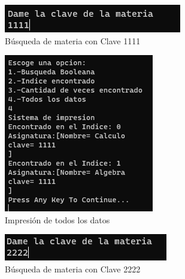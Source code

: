 \documentclass{report}
\begin{document}
\begin{figure}
    \centering
    \includegraphics[width=1\linewidth]{Imagen25.png}
    \caption{Búsqueda de materia con Clave 1111}
    
\end{figure}
\begin{figure}
    \centering
    \includegraphics[width=1\linewidth]{Imagen26.png}
    \caption{Impresión de todos los datos}
\end{figure}
\begin{figure}
    \centering
    \includegraphics[width=1\linewidth]{Imagen27.png}
    \caption{Búsqueda de materia con Clave 2222}
    
\end{figure}
\end{document}
